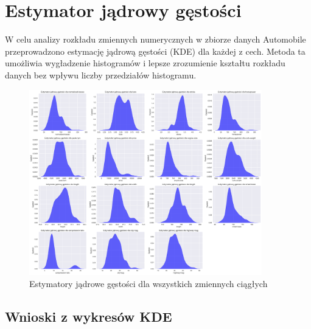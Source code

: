 \documentclass[12pt,a4paper]{article}
\begin{document}
\section{Estymator jądrowy gęstości}

W celu analizy rozkładu zmiennych numerycznych w zbiorze danych Automobile przeprowadzono estymację jądrową gęstości (KDE) dla każdej z cech. Metoda ta umożliwia wygładzenie histogramów i lepsze zrozumienie kształtu rozkładu danych bez wpływu liczby przedziałów histogramu.

\begin{figure}[H]
    \centering
    \includegraphics[width=0.9\textwidth]{figures/kde_plots_all_variables.png}
    \caption{Estymatory jądrowe gęstości dla wszystkich zmiennych ciągłych}
    \label{fig:kde_plots_all_variables}
\end{figure}

\subsection{Wnioski z wykresów KDE}
\end{document}
